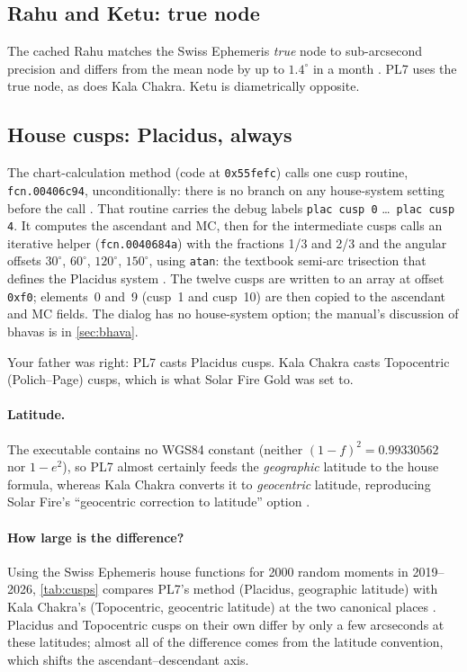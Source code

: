 \subsection{Rahu and Ketu: true node}

The cached Rahu matches the Swiss Ephemeris \emph{true} node to sub-arcsecond precision
and differs from the mean node by up to $1.4^\circ$ in a month \tagNUM. PL7 uses the true
node, as does Kala Chakra. Ketu is diametrically opposite.

\subsection{House cusps: Placidus, always}
\label{sec:placidus}

The chart-calculation method (code at \texttt{0x55fefc}) calls one cusp routine,
\texttt{fcn.00406c94}, unconditionally: there is no branch on any house-system setting
before the call \tagBIN. That routine carries the debug labels \texttt{plac cusp 0}
\ldots\ \texttt{plac cusp 4}. It computes the ascendant and MC, then for the intermediate
cusps calls an iterative helper (\texttt{fcn.0040684a}) with the fractions 1/3 and 2/3 and
the angular offsets $30^\circ$, $60^\circ$, $120^\circ$, $150^\circ$, using
\texttt{atan}: the textbook semi-arc trisection that defines the Placidus system
\tagBIN. The twelve cusps are written to an array at offset \texttt{0xf0}; elements~0 and~9
(cusp~1 and cusp~10) are then copied to the ascendant and MC fields. The dialog has no
house-system option; the manual's discussion of bhavas is in \autoref{sec:bhava}.

\begin{keybox}\kidea Your father was right: PL7 casts Placidus cusps. Kala Chakra casts
Topocentric (Polich--Page) cusps, which is what Solar Fire Gold was set to.\end{keybox}

\paragraph{Latitude.} The executable contains no WGS84 constant (neither
$(1-f)^2 = 0.99330562$ nor $1 - e^2$), so PL7 almost certainly feeds the \emph{geographic}
latitude to the house formula, whereas Kala Chakra converts it to \emph{geocentric}
latitude, reproducing Solar Fire's ``geocentric correction to latitude'' option \tagINF.

\paragraph{How large is the difference?} Using the Swiss Ephemeris house functions for
2000 random moments in 2019--2026, \autoref{tab:cusps} compares PL7's method (Placidus,
geographic latitude) with Kala Chakra's (Topocentric, geocentric latitude) at the two
canonical places \tagNUM. Placidus and Topocentric cusps on their own differ by only a few
arcseconds at these latitudes; almost all of the difference comes from the latitude
convention, which shifts the ascendant--descendant axis.

